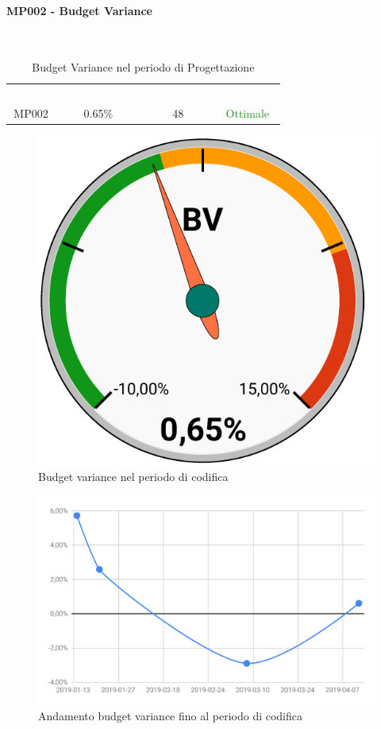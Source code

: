 \paragraph{MP002 - Budget Variance}\mbox{}\\[0,3cm]
    \begin{table}[H]
        \centering
        \begin{tabular}{cccc}
            \rowcolor{greySWEight}
            \textcolor{white}{\textbf{Codice}} &
            \textcolor{white}{\textbf{Valore Indice}}&
            \textcolor{white}{\textbf{Valore in €}}&
            \textcolor{white}{\textbf{Riscontro}}\\
            MP002 & 0.65\% & 48 & \textcolor{ForestGreen}{Ottimale}\\
        \end{tabular}
        \caption{Budget Variance nel periodo di Progettazione}
    \end{table}
    \begin{figure}[H]
        \centering
        \includegraphics[width=0.4\linewidth]{sez/App_Esito/Qualifica/graph/BV_RQ.pdf}
        \caption{Budget variance nel periodo di codifica}
    \end{figure}
    \begin{figure}[H]
        \centering
        \includegraphics[width=0.7\linewidth]{sez/App_Esito/Qualifica/graph/storicoBV_RQ.pdf}
        \caption{Andamento budget variance fino al periodo di codifica}
    \end{figure}